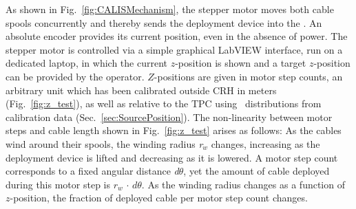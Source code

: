 As shown in Fig.~\ref{fig:CALISMechanism}, the stepper motor moves both cable spools concurrently and thereby sends the deployment device into the \lsv. An absolute encoder provides its current position, even in the absence of power. The stepper motor is controlled via a simple graphical LabVIEW interface, run on a dedicated laptop, in which the current $z$-position is shown and a target $z$-position can be provided by the operator. $Z$-positions are given in motor step counts, an arbitrary unit which has been calibrated outside CRH in meters (Fig.~\ref{fig:z_test}), as well as relative to the TPC using \tdrift\ distributions from calibration data (Sec.~\ref{sec:SourcePosition}). \label{sec:Nonlinearity:MotorStepCounts}
The non-linearity between motor steps and cable length shown in Fig.~\ref{fig:z_test} arises as follows: As the cables wind around their spools, the winding radius \textit{r$_w$} changes, increasing as the deployment device is lifted and decreasing as it is lowered. A motor step count corresponds to a fixed angular distance \textit{d$\theta$}, yet the amount of cable deployed during this motor step is \textit{$r_w\,\cdot\,d\theta$}. As the winding radius changes as a function of $z$-position, the fraction of deployed cable per motor step count changes.

